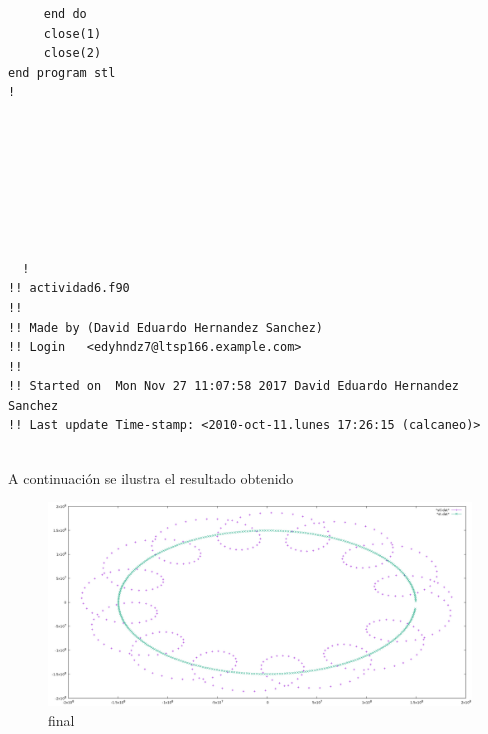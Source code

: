 \documentclass{article}
\begin{document}
\begin{verbatim}
     end do
     close(1)
     close(2)
end program stl
!






  
  
  !
!! actividad6.f90
!! 
!! Made by (David Eduardo Hernandez Sanchez)
!! Login   <edyhndz7@ltsp166.example.com>
!! 
!! Started on  Mon Nov 27 11:07:58 2017 David Eduardo Hernandez Sanchez
!! Last update Time-stamp: <2010-oct-11.lunes 17:26:15 (calcaneo)>


\end{verbatim}
A continuación se ilustra el resultado obtenido
\begin{figure}[h!]
  \includegraphics[width=\linewidth]{STL.png}
  \caption{final}
  \label{fig:boat1}
  \end{figure}
\end{document}
